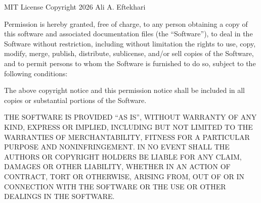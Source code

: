 \begin{keybox}{MIT License}
\noindent Copyright \textcopyright{} 2026 Ali A. Eftekhari

\smallskip
\noindent Permission is hereby granted, free of charge, to any person obtaining a
copy of this software and associated documentation files (the ``Software''), to
deal in the Software without restriction, including without limitation the rights
to use, copy, modify, merge, publish, distribute, sublicense, and/or sell copies of
the Software, and to permit persons to whom the Software is furnished to do so,
subject to the following conditions:

\smallskip
\noindent The above copyright notice and this permission notice shall be included
in all copies or substantial portions of the Software.

\smallskip
\noindent THE SOFTWARE IS PROVIDED ``AS IS'', WITHOUT WARRANTY OF ANY KIND, EXPRESS
OR IMPLIED, INCLUDING BUT NOT LIMITED TO THE WARRANTIES OF MERCHANTABILITY, FITNESS
FOR A PARTICULAR PURPOSE AND NONINFRINGEMENT. IN NO EVENT SHALL THE AUTHORS OR
COPYRIGHT HOLDERS BE LIABLE FOR ANY CLAIM, DAMAGES OR OTHER LIABILITY, WHETHER IN AN
ACTION OF CONTRACT, TORT OR OTHERWISE, ARISING FROM, OUT OF OR IN CONNECTION WITH
THE SOFTWARE OR THE USE OR OTHER DEALINGS IN THE SOFTWARE.
\end{keybox}
